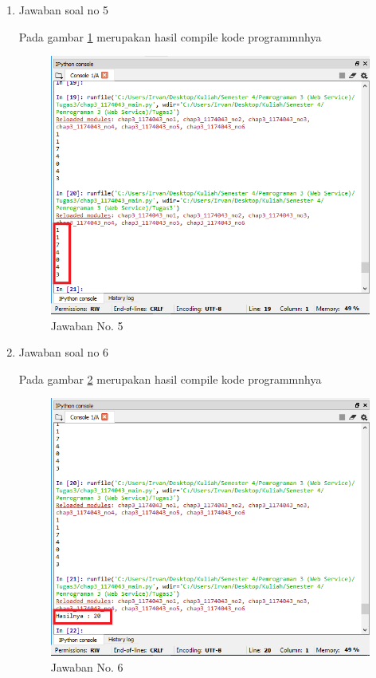 \begin{enumerate}
				
			\item Jawaban soal no 5
				

				\subitem Pada gambar \ref{gambar5} merupakan hasil compile kode programmnhya				

				\begin{figure} [ht]
					\centerline{\includegraphics[width=1\textwidth]{figures/chapter3/5_1174043.png}}
					\caption{Jawaban No. 5}
					\label{gambar5}
				\end{figure}

				
			\item Jawaban soal no 6
				
				
				\subitem Pada gambar \ref{gambar6} merupakan hasil compile kode programmnhya	

				\begin{figure} [ht]
					\centerline{\includegraphics[width=1\textwidth]{figures/chapter3/6_1174043.png}}
					\caption{Jawaban No. 6}
					\label{gambar6}
				\end{figure}


\end{enumerate}
